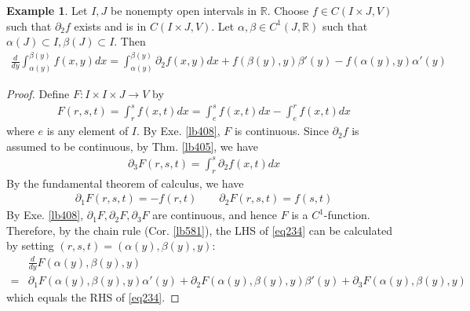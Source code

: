 \documentclass[12pt,b5paper,notitlepage]{article}
\theoremstyle{definition}
\newtheorem{eg}[df]{Example}
\theoremstyle{plain}
\newcommand{\mc}{\mathcal}
\newcommand{\Rbb}{\mathbb R}
\numberwithin{equation}{section}
\begin{document}
\begin{comment}
\begin{eg}
Every $A\in\mc L(\Rbb^N)$ is differentiable everywhere, and $A$ is the diffferential of itself. It follows from chain rule that if $I$ is an open interval and $f\in C^1(I,\Rbb^N)$, then
\begin{align*}
\frac d{dt}Af(t)=Af'(t)
\end{align*}
\end{eg}
\end{comment}
\begin{eg}\label{lb583}
Let $I,J$ be nonempty open intervals in $\Rbb$. Choose $f\in C(I\times J,V)$ such that $\partial_2f$ exists and is in $C(I\times J,V)$. Let $\alpha,\beta\in C^1(J,\Rbb)$ such that $\alpha(J)\subset I,\beta(J)\subset I$. Then
\begin{align}\label{eq234}
\frac d{dy}\int_{\alpha(y)}^{\beta(y)}f(x,y)dx=\int_{\alpha(y)}^{\beta(y)}\partial_2 f(x,y)dx+f(\beta(y),y)\beta'(y)-f(\alpha(y),y)\alpha'(y)
\end{align}
\end{eg}


\begin{proof}
Define $F:I\times I\times J\rightarrow V$ by
\begin{align*}
F(r,s,t)=\int_r^s f(x,t)dx=\int_e^s f(x,t)dx-\int_e^r f(x,t)dx
\end{align*}
where $e$ is any element of $I$. By Exe. \ref{lb408}, $F$ is continuous. Since $\partial_2f$ is assumed to be continuous, by Thm. \ref{lb405}, we have
\begin{align*}
\partial_3 F(r,s,t)=\int_r^s \partial_2 f(x,t)dx
\end{align*}
By the fundamental theorem of calculus, we have
\begin{align*}
\partial_1 F(r,s,t)=-f(r,t)\qquad\partial_2 F(r,s,t)=f(s,t)
\end{align*}
By Exe. \ref{lb408}, $\partial_1F,\partial_2F,\partial_3F$ are continuous, and hence $F$ is a $C^1$-function. Therefore, by the chain rule (Cor. \ref{lb581}), the LHS of \eqref{eq234} can be calculated by setting $(r,s,t)=(\alpha(y),\beta(y),y)$:
\begin{align*}
&\frac d{dy}F(\alpha(y),\beta(y),y)\\
=&\partial_1 F(\alpha(y),\beta(y),y)\alpha'(y)+\partial_2 F(\alpha(y),\beta(y),y)\beta'(y)+\partial_3F(\alpha(y),\beta(y),y)
\end{align*}
which equals the RHS of \eqref{eq234}.
\end{proof}
\end{document}
